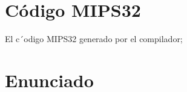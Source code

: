 \documentclass[a4paper,11pt]{article}
\begin{document}
\section{C\'odigo MIPS32}
El c´odigo MIPS32 generado por el compilador;

\section{Enunciado}

\maketitle
\end{document}
